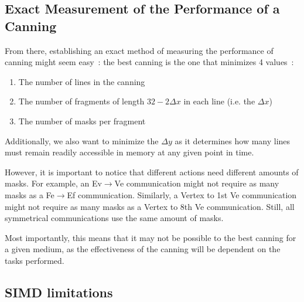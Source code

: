 \documentclass{report}
\begin{document}
\subsection{Exact Measurement of the Performance of a Canning}

From there, establishing an exact method of measuring the performance of canning might seem easy~: the best canning is the one that minimizes 4 values~:
\begin{enumerate}
	\item The number of lines in the canning
	\item The number of fragments of length $32-2\Delta x$ in each line (i.e. the $\Delta x$)
	\item The number of masks per fragment
\end{enumerate}
Additionally, we also want to minimize the $\Delta y$ as it determines how many lines must remain readily accessible in memory at any given point in time.

However, it is important to notice that different actions need different amounts of masks. For example,  an Ev$\rightarrow$Ve communication might not require as many masks as a Fe$\rightarrow$Ef communication. Similarly, a Vertex to 1st Ve communication might not require as many masks as a Vertex to 8th Ve communication. Still, all symmetrical communications use the same amount of masks.

Most importantly, this means that it may not be possible to the best canning for a given medium, as the effectiveness of the canning will be dependent on the tasks performed.

\subsection{SIMD limitations}
\label{simd_limitations}
\end{document}
